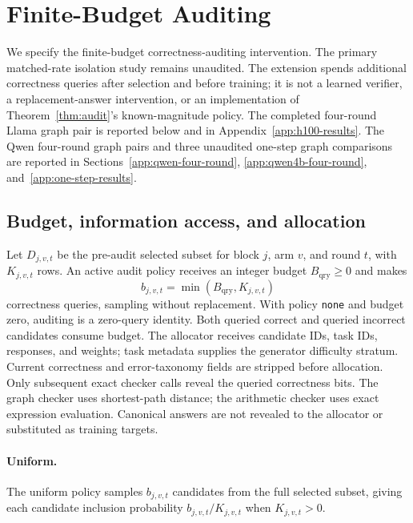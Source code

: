 \section{Finite-Budget Auditing}
\label{app:budgeted-auditing}

We specify the finite-budget correctness-auditing intervention.
The primary matched-rate isolation study remains unaudited. The extension
spends additional correctness queries after selection and before training;
it is not a learned verifier, a replacement-answer intervention, or an
implementation of Theorem~\ref{thm:audit}'s known-magnitude policy.
The completed four-round Llama graph pair is reported below and in
Appendix~\ref{app:h100-results}. The Qwen four-round graph pairs
and three unaudited one-step graph comparisons are reported in
Sections~\ref{app:qwen-four-round}, \ref{app:qwen4b-four-round},
and~\ref{app:one-step-results}.

\subsection{Budget, information access, and allocation}

Let $D_{j,v,t}$ be the pre-audit selected subset for block $j$, arm $v$,
and round $t$, with $K_{j,v,t}$ rows. An active audit policy receives an
integer budget $B_{\mathrm{qry}}\geq0$ and makes
\[
 b_{j,v,t}=\min(B_{\mathrm{qry}},K_{j,v,t})
\]
correctness queries, sampling without replacement. With policy
\texttt{none} and budget zero, auditing is a zero-query identity.
Both queried correct and queried incorrect candidates consume budget.
The allocator receives candidate IDs, task IDs, responses, and weights;
task metadata supplies the generator difficulty stratum.
Current correctness and error-taxonomy fields
are stripped before allocation. Only subsequent exact checker calls reveal
the queried correctness bits. The graph checker uses shortest-path distance;
the arithmetic checker uses exact expression evaluation. Canonical answers
are not revealed to the allocator or substituted as training targets.

\paragraph{Uniform.}
The uniform policy samples $b_{j,v,t}$ candidates from the full selected subset, giving each
candidate inclusion probability $b_{j,v,t}/K_{j,v,t}$ when $K_{j,v,t}>0$.


